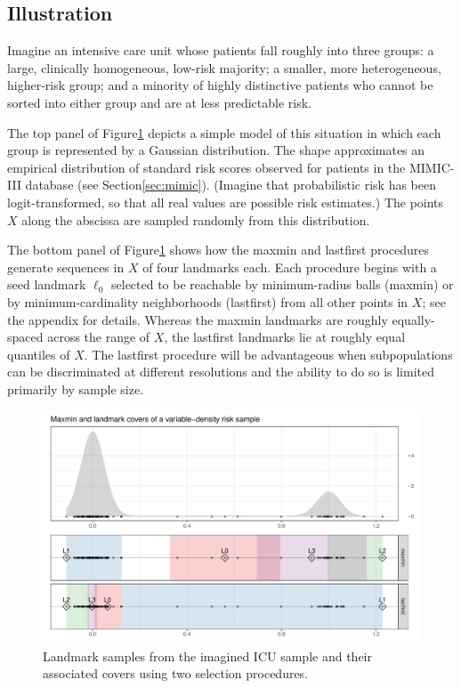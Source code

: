 \documentclass[
]{article}
\begin{document}
\hypertarget{illustration}{%
\subsection{Illustration}\label{illustration}}

Imagine an intensive care unit whose patients fall roughly into three
groups: a large, clinically homogeneous, low-risk majority; a smaller,
more heterogeneous, higher-risk group; and a minority of highly
distinctive patients who cannot be sorted into either group and are at
less predictable risk.

The top panel of Figure\nbs\ref{fig:icu-cover} depicts a simple model of
this situation in which each group is represented by a Gaussian
distribution. The shape approximates an empirical distribution of
standard risk scores observed for patients in the MIMIC-III database
(see Section\nbs\ref{sec:mimic}). (Imagine that probabilistic risk has
been logit-transformed, so that all real values are possible risk
estimates.) The points \(X\) along the abscissa are sampled randomly
from this distribution.

The bottom panel of Figure\nbs\ref{fig:icu-cover} shows how the maxmin
and lastfirst procedures generate sequences in \(X\) of four landmarks
each. Each procedure begins with a seed landmark \(\ell_0\) selected to
be reachable by minimum-radius balls (maxmin) or by minimum-cardinality
neighborhoods (lastfirst) from all other points in \(X\); see the
appendix for details. Whereas the maxmin landmarks are roughly
equally-spaced across the range of \(X\), the lastfirst landmarks lie at
roughly equal quantiles of \(X\). The lastfirst procedure will be
advantageous when subpopulations can be discriminated at different
resolutions and the ability to do so is limited primarily by sample
size.

\begin{figure}
\includegraphics[width=\textwidth]{../figures/vardens-cover}
\caption{
Landmark samples from the imagined ICU sample and their associated covers using two selection procedures.
\label{fig:icu-cover}
}
\end{figure}
\end{document}
